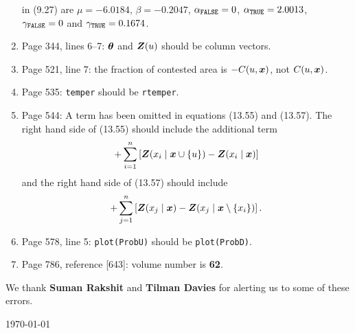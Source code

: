 \documentclass[12pt,a4paper]{article}
\newcommand{\boldmaths}[1]{{\ensuremath\boldsymbol{#1}}}
\newcommand{\bx}{\boldmaths x}
\newcommand{\bZ}{\boldmaths Z}
\begin{document}
\begin{enumerate}
  in (9.27) are $\mu =-6.0184$, $\beta=-0.2047$,
  $\alpha_{\mbox{\scriptsize \texttt{FALSE}}} = 0$,
  $\alpha_{\mbox{\scriptsize \texttt{TRUE}}} = 2.0013$,
  $\gamma_{\mbox{\scriptsize \texttt{FALSE}}} = 0$ and
  $\gamma_{\mbox{\scriptsize \texttt{TRUE}}} = 0.1674$.
\item Page 344, lines 6--7: $\boldmaths\theta$ and $\bZ(u)$ 
should be column vectors.
\item Page 521, line 7: the fraction of contested area is $-C(u, \bx)$,
not $C(u,\bx)$.
\item Page 535: \texttt{temper} should be \texttt{rtemper}.
\item Page 544: A term has been omitted in equations (13.55) and (13.57).
The right hand side of (13.55) should include the additional term
\[
   + \sum_{i=1}^n \left[ \bZ(x_i \mid \bx \cup \{u\}) - \bZ(x_i \mid \bx) \right]
\]
and the right hand side of (13.57) should include
\[
  + \sum_{j=1}^n \left[ \bZ(x_j \mid \bx) - \bZ(x_j \mid \bx \setminus \{x_i\}) \right].
\]
\item Page 578, line 5: \texttt{plot(ProbU)} should be \texttt{plot(ProbD)}.
\item Page 786, reference [643]: volume number is \textbf{62}.
\end{enumerate}

We thank \textbf{Suman Rakshit} and \textbf{Tilman Davies}
for alerting us to some of these errors.\\

\vspace*{\fill}


\hspace*{\fill} \today
\end{document}
